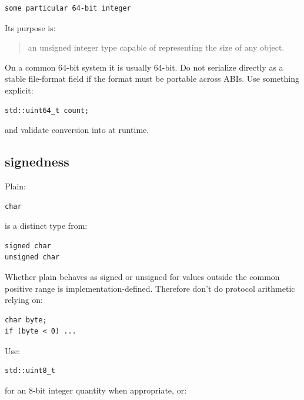 \begin{verbatim}
some particular 64-bit integer
\end{verbatim}

Its purpose is:

\begin{quote}
an unsigned integer type capable of representing the size of any object.
\end{quote}

On a common 64-bit system it is usually 64-bit. Do not serialize  directly as a stable file-format field if the format must be portable across ABIs. Use something explicit:

\begin{verbatim}
std::uint64_t count;
\end{verbatim}

and validate conversion into  at runtime.

\subsection{\texorpdfstring{ signedness}{ signedness}}\label{05-engine-i-ch002-char-signedness}

\hypertarget{05-engine-i-ch002-char-signedness}{}

Plain:

\begin{verbatim}
char
\end{verbatim}

is a distinct type from:

\begin{verbatim}
signed char
unsigned char
\end{verbatim}

Whether plain  behaves as signed or unsigned for values outside the common positive range is implementation-defined. Therefore don't do protocol arithmetic relying on:

\begin{verbatim}
char byte;
if (byte < 0) ...
\end{verbatim}

Use:

\begin{verbatim}
std::uint8_t
\end{verbatim}

for an 8-bit integer quantity when appropriate, or:

